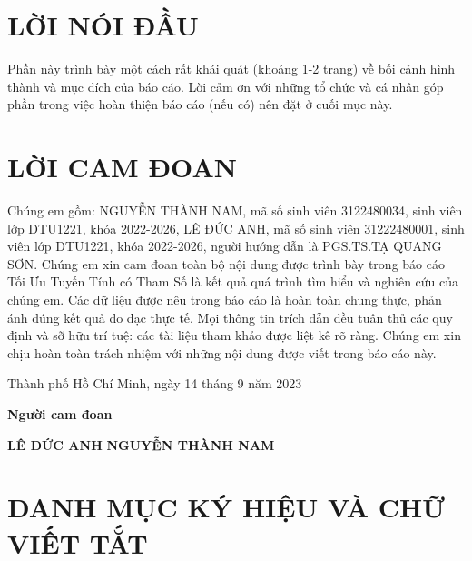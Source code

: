 \documentclass{article} %
\begin{document}
\section*{LỜI NÓI ĐẦU}
\thispagestyle{empty}
Phần này trình bày một cách rất khái quát (khoảng 1-2 trang) về bối cảnh hình thành và mục đích của báo cáo. Lời cảm ơn với những tổ chức và cá nhân góp phần trong việc hoàn thiện báo cáo (nếu có) nên đặt ở cuối mục này.
\cleardoublepage
\section*{LỜI CAM ĐOAN}
\thispagestyle{empty}
Chúng em gồm: NGUYỄN THÀNH NAM, mã số sinh viên 3122480034, sinh viên lớp DTU1221, khóa 2022-2026, LÊ ĐỨC ANH, mã số sinh viên 31222480001, sinh viên lớp DTU1221, khóa 2022-2026, người hướng dẫn là PGS.TS.TẠ QUANG SƠN. Chúng em xin cam đoan toàn bộ nội dung được trình bày trong báo cáo Tối Ưu Tuyến Tính có Tham Số là kết quả quá trình tìm hiểu và nghiên cứu của chúng em. Các dữ liệu được nêu trong báo cáo là hoàn toàn chung thực, phản ánh đúng kết quả đo đạc thực tế. Mọi thông tin trích dẫn đều tuân thủ các quy định và sỡ hữu trí tuệ: các tài liệu tham khảo được liệt kê rõ ràng. Chúng em xin chịu hoàn toàn trách nhiệm với những nội dung được viết trong báo cáo này.

\vspace{6pt}
\hspace{4.5cm}Thành phố Hồ Chí Minh, ngày 14 tháng 9 năm 2023 

\hspace{7.5cm}\textbf{Người cam đoan}

\vspace{2cm}
\hspace{4cm}\textbf{LÊ ĐỨC ANH} \hspace{3.5cm}\textbf{NGUYỄN THÀNH NAM} 
\cleardoublepage

\tableofcontents %
\thispagestyle{empty}
\cleardoublepage

\section*{DANH MỤC KÝ HIỆU VÀ CHỮ VIẾT TẮT}
\cleardoublepage

\listoffigures %
\cleardoublepage
\end{document}
